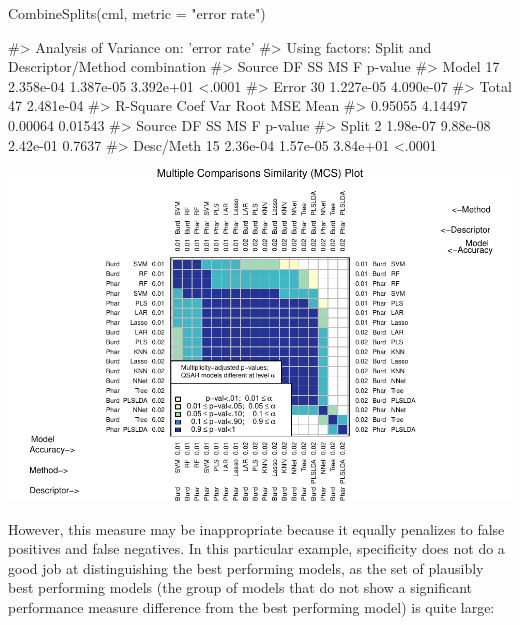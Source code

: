 \begin{Schunk}
\begin{Sinput}
CombineSplits(cml, metric = "error rate")
\end{Sinput}
\begin{Soutput}
#>    Analysis of Variance on: 'error rate'
#>  Using factors: Split and Descriptor/Method combination
#> Source    DF          SS          MS           F   p-value   
#> Model     17   2.358e-04   1.387e-05   3.392e+01    <.0001   
#> Error     30   1.227e-05   4.090e-07   
#> Total     47   2.481e-04   
#>       R-Square   Coef Var   Root MSE       Mean   
#>        0.95055    4.14497    0.00064    0.01543   
#> Source       DF         SS         MS          F   p-value   
#> Split         2   1.98e-07   9.88e-08   2.42e-01    0.7637   
#> Desc/Meth    15   2.36e-04   1.57e-05   3.84e+01    <.0001
\end{Soutput}

\includegraphics{chemmodlabRJournal_files/figure-latex/CombineSplits_er-1} \end{Schunk}

However, this measure may be inappropriate because it equally penalizes
to false positives and false negatives. In this particular example,
specificity does not do a good job at distinguishing the best performing
models, as the set of plausibly best performing models (the group of
models that do not show a significant performance measure difference
from the best performing model) is quite large:

